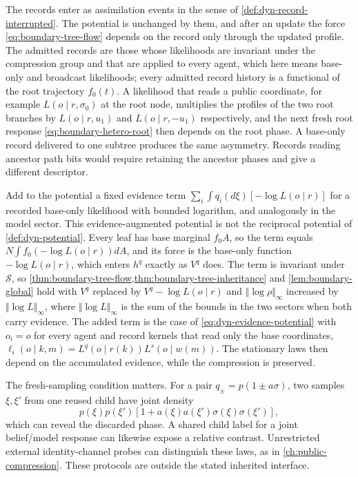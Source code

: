 The records enter as assimilation events in the sense of \cref{def:dyn-record-interrupted}. The potential is unchanged by them, and after an update the force \cref{eq:boundary-tree-flow} depends on the record only through the updated profile. The admitted records are those whose likelihoods are invariant under the compression group and that are applied to every agent, which here means base-only and broadcast likelihoods; every admitted record history is a functional of the root trajectory $f_0(t)$. A likelihood that reads a public coordinate, for example $L(o\mid r,\sigma_0)$ at the root node, multiplies the profiles of the two root branches by $L(o\mid r,u_1)$ and $L(o\mid r,-u_1)$ respectively, and the next fresh root response \cref{eq:boundary-hetero-root} then depends on the root phase. A base-only record delivered to one subtree produces the same asymmetry. Records reading ancestor path bits would require retaining the ancestor phases and give a different descriptor.

Add to the potential a fixed evidence term $\sum_i\int q_i(d\xi)[-\log L(o\mid r)]$ for a recorded base-only likelihood with bounded logarithm, and analogously in the model sector. This evidence-augmented potential is not the reciprocal potential of \cref{def:dyn-potential}. Every leaf has base marginal $f_0A$, so the term equals $N\int f_0(-\log L(o\mid r))dA$, and its force is the base-only function $-\log L(o\mid r)$, which enters $h^q$ exactly as $V^q$ does. The term is invariant under $\mathcal S$, so \cref{thm:boundary-tree-flow,thm:boundary-tree-inheritance} and \cref{lem:boundary-global} hold with $V^q$ replaced by $V^q-\log L(o\mid r)$ and $\Vert\log\rho\Vert_\infty$ increased by $\Vert\log L\Vert_\infty$, where $\Vert\log L\Vert_\infty$ is the sum of the bounds in the two sectors when both carry evidence. The added term is the case of \cref{eq:dyn-evidence-potential} with $o_i=o$ for every agent and record kernels that read only the base coordinates, $\ell_i(o\mid k,m)=L^q(o\mid r(k))L^s(o\mid w(m))$. The stationary laws then depend on the accumulated evidence, while the compression is preserved.

The fresh-sampling condition matters. For a pair $q_\pm=p(1\pm a\sigma)$, two samples $\xi,\xi'$ from one reused child have joint density
\begin{equation}
 p(\xi)p(\xi')[1+a(\xi)a(\xi')\sigma(\xi)\sigma(\xi')],
 \label{eq:boundary-tree-reuse}
\end{equation}
which can reveal the discarded phase. A shared child label for a joint belief/model response can likewise expose a relative contrast. Unrestricted external identity-channel probes can distinguish these laws, as in \cref{ch:public-compression}. These protocols are outside the stated inherited interface.

